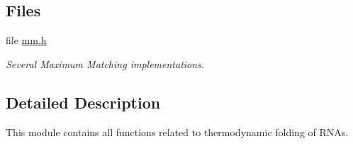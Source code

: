\subsection*{Files}
\begin{DoxyCompactItemize}
\item 
file \hyperlink{mm_8h}{mm.\-h}
\begin{DoxyCompactList}\small\item\em Several Maximum Matching implementations. \end{DoxyCompactList}\end{DoxyCompactItemize}


\subsection{Detailed Description}
This module contains all functions related to thermodynamic folding of R\-N\-As. 